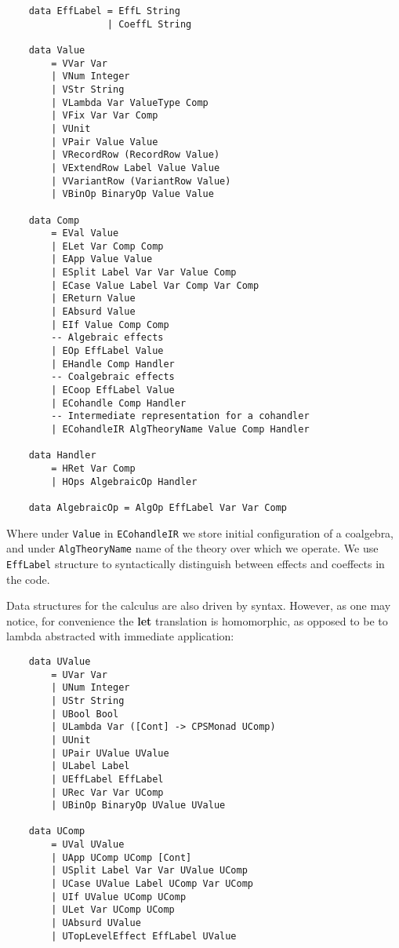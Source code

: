 \documentclass[declaration,shortabstract]{iithesis}
\theoremstyle{definition} \newtheorem{definition}{Definition}[chapter]
\theoremstyle{remark} \newtheorem{remark}[definition]{Observation}
\theoremstyle{plain} \newtheorem{theorem}[definition]{Theorem}
\theoremstyle{plain} \newtheorem{lemma}[definition]{Lemma}
\begin{document}
\begin{verbatim}
    data EffLabel = EffL String
                  | CoeffL String

    data Value
        = VVar Var
        | VNum Integer
        | VStr String
        | VLambda Var ValueType Comp
        | VFix Var Var Comp
        | VUnit
        | VPair Value Value
        | VRecordRow (RecordRow Value)
        | VExtendRow Label Value Value
        | VVariantRow (VariantRow Value)
        | VBinOp BinaryOp Value Value

    data Comp
        = EVal Value
        | ELet Var Comp Comp
        | EApp Value Value
        | ESplit Label Var Var Value Comp
        | ECase Value Label Var Comp Var Comp
        | EReturn Value
        | EAbsurd Value
        | EIf Value Comp Comp
        -- Algebraic effects
        | EOp EffLabel Value
        | EHandle Comp Handler
        -- Coalgebraic effects
        | ECoop EffLabel Value
        | ECohandle Comp Handler
        -- Intermediate representation for a cohandler
        | ECohandleIR AlgTheoryName Value Comp Handler

    data Handler
        = HRet Var Comp
        | HOps AlgebraicOp Handler

    data AlgebraicOp = AlgOp EffLabel Var Var Comp
\end{verbatim}

    \noindent
    Where under \verb!Value! in \verb!ECohandleIR! we store initial
    configuration of a coalgebra, and under \verb!AlgTheoryName! name of the
    theory over which we operate. We use \verb!EffLabel! structure to
    syntactically distinguish between effects and coeffects in the code.

    Data structures for the calculus are also driven by syntax. However, as one
    may notice, for convenience the \textbf{let} translation is homomorphic,
    as opposed to be to lambda abstracted with immediate application:

\begin{verbatim}
    data UValue
        = UVar Var
        | UNum Integer
        | UStr String
        | UBool Bool
        | ULambda Var ([Cont] -> CPSMonad UComp)
        | UUnit
        | UPair UValue UValue
        | ULabel Label
        | UEffLabel EffLabel
        | URec Var Var UComp
        | UBinOp BinaryOp UValue UValue

    data UComp
        = UVal UValue
        | UApp UComp UComp [Cont]
        | USplit Label Var Var UValue UComp
        | UCase UValue Label UComp Var UComp
        | UIf UValue UComp UComp
        | ULet Var UComp UComp
        | UAbsurd UValue
        | UTopLevelEffect EffLabel UValue
\end{verbatim}
\end{document}
